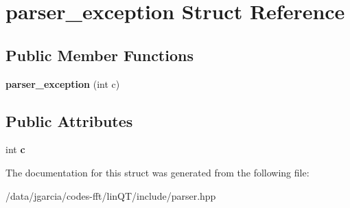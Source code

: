 \hypertarget{structparser__exception}{}\section{parser\+\_\+exception Struct Reference}
\label{structparser__exception}
\subsection*{Public Member Functions}
\begin{DoxyCompactItemize}
\item 
{\bfseries parser\+\_\+exception} (int c)\hypertarget{structparser__exception_a35b8148448420fcb65e7246c0b40c87e}{}\label{structparser__exception_a35b8148448420fcb65e7246c0b40c87e}

\end{DoxyCompactItemize}
\subsection*{Public Attributes}
\begin{DoxyCompactItemize}
\item 
int {\bfseries c}\hypertarget{structparser__exception_abac15dceeba23112a5048327483d2814}{}\label{structparser__exception_abac15dceeba23112a5048327483d2814}

\end{DoxyCompactItemize}


The documentation for this struct was generated from the following file\+:\begin{DoxyCompactItemize}
\item 
/data/jgarcia/codes-\/fft/lin\+Q\+T/include/parser.\+hpp\end{DoxyCompactItemize}
